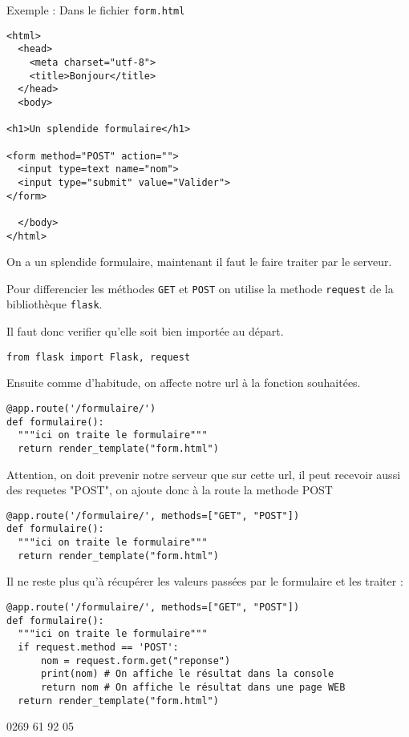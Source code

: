 \documentclass[12pt,a4paper]{article}
\begin{document}
Exemple : Dans le fichier \texttt{form.html}

\begin{verbatim}
<html>
  <head>
    <meta charset="utf-8">
    <title>Bonjour</title> 
  </head>
  <body>
    
<h1>Un splendide formulaire</h1>

<form method="POST" action="">
  <input type=text name="nom">
  <input type="submit" value="Valider">
</form>

  </body>
</html>
\end{verbatim}


On a un splendide formulaire, maintenant il faut le faire traiter par le serveur.

\par \vspace{5mm}

Pour differencier les méthodes \texttt{GET} et \texttt{POST} on utilise la methode \texttt{request} de la bibliothèque \texttt{flask}. \par 

\medskip

Il faut donc verifier qu'elle soit bien importée au départ.


\begin{verbatim}
from flask import Flask, request
\end{verbatim}

\bigskip

Ensuite comme d'habitude, on affecte notre url à la fonction souhaitées.

\begin{verbatim}
@app.route('/formulaire/')
def formulaire():
  """ici on traite le formulaire"""
  return render_template("form.html")
\end{verbatim}


Attention, on doit prevenir notre serveur que sur cette url, il peut recevoir aussi des requetes "POST", on ajoute donc à la route la methode POST


\begin{verbatim}
@app.route('/formulaire/', methods=["GET", "POST"])
def formulaire():
  """ici on traite le formulaire"""
  return render_template("form.html")
\end{verbatim}


Il ne reste plus qu'à récupérer les valeurs passées par le formulaire et les traiter : 

\begin{verbatim}
@app.route('/formulaire/', methods=["GET", "POST"])
def formulaire():
  """ici on traite le formulaire"""
  if request.method == 'POST':
      nom = request.form.get("reponse")
      print(nom) # On affiche le résultat dans la console
      return nom # On affiche le résultat dans une page WEB
  return render_template("form.html")
\end{verbatim}

0269 61 92 05
\end{document}
